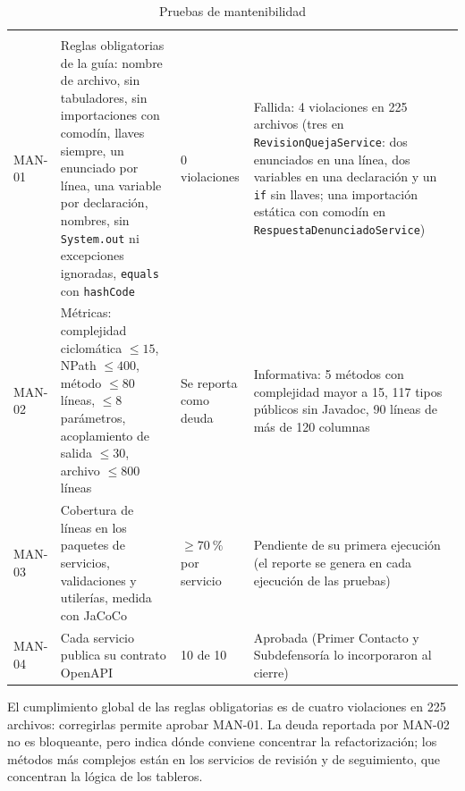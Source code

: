 	\small
	\renewcommand{\arraystretch}{1.2}
	\setlength{\tabcolsep}{4pt}
	\begin{longtable}{|p{1.2cm}|L{5.5cm}|L{3.1cm}|L{4.7cm}|}
		\caption{Pruebas de mantenibilidad}
		\label{tab:pruebas_mantenibilidad} \\
		\hline
		 &  &  &  \\
		\hline
		\endfirsthead
		\hline
		 &  &  &  \\
		\hline
		\endhead
		MAN-01 & Reglas obligatorias de la guía: nombre de archivo, sin tabuladores, sin importaciones con
		comodín, llaves siempre, un enunciado por línea, una variable por declaración, nombres, sin
		\texttt{System.out} ni excepciones ignoradas, \texttt{equals} con \texttt{hashCode} & 0
		violaciones & Fallida: 4 violaciones en 225 archivos (tres en \texttt{RevisionQuejaService}: dos
		enunciados en una línea, dos variables en una declaración y un \texttt{if} sin llaves; una
		importación estática con comodín en \texttt{RespuestaDenunciadoService}) \\ \hline
		MAN-02 & Métricas: complejidad ciclomática $\leq 15$, NPath $\leq 400$, método $\leq 80$ líneas,
		$\leq 8$ parámetros, acoplamiento de salida $\leq 30$, archivo $\leq 800$ líneas & Se reporta como
		deuda & Informativa: 5 métodos con complejidad mayor a 15, 117 tipos públicos sin Javadoc, 90 líneas
		de más de 120 columnas \\ \hline
		MAN-03 & Cobertura de líneas en los paquetes de servicios, validaciones y utilerías, medida con
		JaCoCo & $\geq 70~\%$ por servicio & Pendiente de su primera ejecución (el reporte se
		genera en cada ejecución de las pruebas) \\ \hline
		MAN-04 & Cada servicio publica su contrato OpenAPI & 10 de 10 & Aprobada (Primer Contacto y
		Subdefensoría lo incorporaron al cierre) \\ \hline
	\end{longtable}
	\normalsize

	El cumplimiento global de las reglas obligatorias es de cuatro violaciones en 225 archivos: corregirlas
	permite aprobar MAN-01. La deuda reportada por MAN-02 no es bloqueante, pero indica dónde conviene
	concentrar la refactorización; los métodos más complejos están en los servicios de revisión y de
	seguimiento, que concentran la lógica de los tableros.

